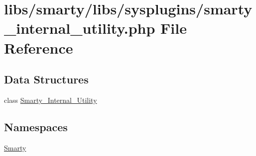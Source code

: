 \hypertarget{smarty__internal__utility_8php}{}\section{libs/smarty/libs/sysplugins/smarty\+\_\+internal\+\_\+utility.php File Reference}
\label{smarty__internal__utility_8php}
\subsection*{Data Structures}
\begin{DoxyCompactItemize}
\item 
class \hyperlink{class_smarty___internal___utility}{Smarty\+\_\+\+Internal\+\_\+\+Utility}
\end{DoxyCompactItemize}
\subsection*{Namespaces}
\begin{DoxyCompactItemize}
\item 
 \hyperlink{namespace_smarty}{Smarty}
\end{DoxyCompactItemize}
